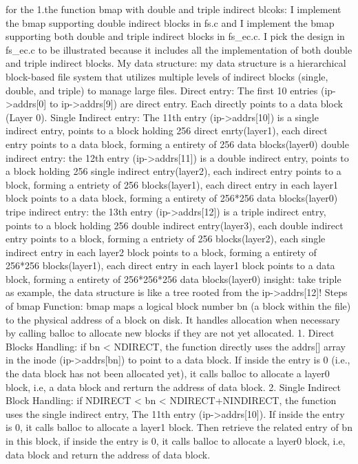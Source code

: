 \documentclass{article}
\begin{document}
for the 1.the function bmap with double and triple indirect blcoks:
I implement the bmap supporting double indirect blocks in fs.c and I implement the bmap supporting both double and triple indirect blocks in fs_ec.c.
I pick the design in fs_ec.c to be illustrated because it includes all the implementation of both double and triple indirect blocks.
My data structure: my data structure is a hierarchical block-based file system that utilizes multiple levels of indirect blocks (single, double, and triple) to manage large files. 
Direct entry: The first 10 entries (ip->addrs[0] to ip->addrs[9]) are direct entry. Each directly points to a data block (Layer 0).
Single Indirect entry: The 11th entry (ip->addrs[10]) is a single indirect entry, points to a block holding 256 direct enrty(layer1), each direct entry points to a data block, forming a entirety of 256 data blocks(layer0)
double indirect entry: the 12th entry (ip->addrs[11]) is a double indirect entry, points to a block holding 256 single indirect entry(layer2), each indirect entry points to a block, forming a entriety of 256 blocks(layer1), each direct entry in each layer1 block points to a data block, forming a entirety of 256*256 data blocks(layer0)
tripe  indirect entry: the 13th entry (ip->addrs[12]) is a triple indirect entry, points to a block holding 256 double indirect entry(layer3), each double indirect entry points to a block, forming a entriety of 256 blocks(layer2), each single indirect entry in each layer2 block points to a block, forming a entirety of 256*256 blocks(layer1), each direct entry in each layer1 block points to a data block, forming a entirety of 256*256*256 data blocks(layer0)
insight: take triple as example, the data structure is like a tree rooted from the ip->addrs[12]!
Steps of bmap Function: bmap maps a logical block number bn (a block within the file) to the physical address of a block on disk. It handles allocation when necessary by calling balloc to allocate new blocks if they are not yet allocated.
1. Direct Blocks Handling: if bn < NDIRECT, the function directly uses the addrs[] array in the inode (ip->addrs[bn]) to point to a data block. If inside the entry is 0 (i.e., the data block has not been allocated yet), it calls balloc to allocate a layer0 block, i.e, a data block and rerturn the address of data block.
2. Single Indirect Block Handling: if NDIRECT < bn < NDIRECT+NINDIRECT, the function uses the single indirect entry, The 11th entry (ip->addrs[10]). If inside the entry is 0, it calls balloc to allocate a layer1 block. Then retrieve the related entry of bn in this block, if inside the entry is 0, it calls balloc to allocate a layer0 block, i.e, data block and return the address of data block.
\end{document}
